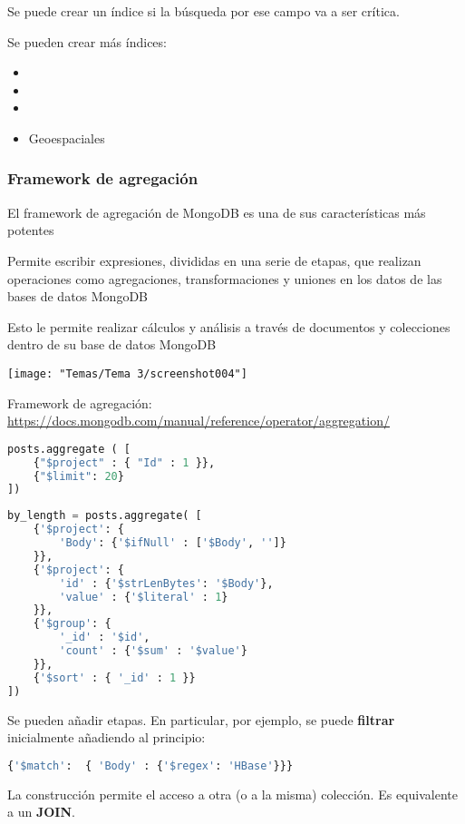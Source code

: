 Se puede crear un índice si la búsqueda por ese campo va a ser crítica.

Se pueden crear más índices:
\begin{itemize}
	\item {}
	\item {}
	\item {}
	\item Geoespaciales
\end{itemize}
\subsubsection{Framework de agregación}
El framework de agregación de MongoDB es una de sus características más potentes

Permite escribir expresiones, divididas en una serie de etapas, que realizan operaciones como agregaciones, transformaciones y uniones en los datos de las bases de datos MongoDB

Esto le permite realizar cálculos y análisis a través de documentos y colecciones dentro de su base de datos MongoDB
\begin{center}
	\texttt{[image: "Temas/Tema 3/screenshot004"]}
\end{center}
Framework de agregación: \url{https://docs.mongodb.com/manual/reference/operator/aggregation/}
\begin{lstlisting}[language=python]
posts.aggregate ( [
	{"$project" : { "Id" : 1 }},
	{"$limit": 20}
])
\end{lstlisting}
\begin{lstlisting}[language=python]
by_length = posts.aggregate( [
	{'$project': {
		'Body': {'$ifNull' : ['$Body', '']}
	}},
	{'$project': {
		'id' : {'$strLenBytes': '$Body'},
		'value' : {'$literal' : 1}
	}},
	{'$group': {
		'_id' : '$id',
		'count' : {'$sum' : '$value'}
	}},
	{'$sort' : { '_id' : 1 }}
])
\end{lstlisting}
Se pueden añadir etapas. En particular, por ejemplo, se puede \textbf{filtrar} inicialmente añadiendo al principio:
\begin{lstlisting}[language=python]
{'$match':  { 'Body' : {'$regex': 'HBase'}}}
\end{lstlisting}
La construcción  permite el acceso a otra (o a la misma) colección. Es equivalente a un \textbf{JOIN}.


